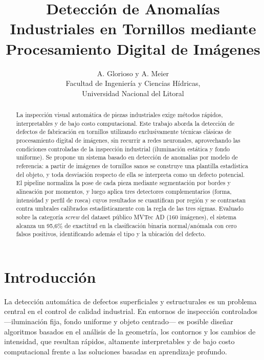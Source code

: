 \documentclass[final]{article}
\begin{document}
\def\tablename{Tabla}          %

\title{Detección de Anomalías Industriales en Tornillos mediante
       Procesamiento Digital de Imágenes}

\author{A. Glorioso y A. Meier \\
        Facultad de Ingeniería y Ciencias Hídricas, \\
        Universidad Nacional del Litoral}

\maketitle

\begin{abstract}
La inspección visual automática de piezas industriales exige métodos rápidos,
interpretables y de bajo costo computacional. Este trabajo aborda la detección
de defectos de fabricación en tornillos utilizando exclusivamente técnicas
clásicas de procesamiento digital de imágenes, sin recurrir a redes neuronales,
aprovechando las condiciones controladas de la inspección industrial
(iluminación estática y fondo uniforme). Se propone un sistema basado en
detección de anomalías por modelo de referencia: a partir de imágenes de
tornillos sanos se construye una plantilla estadística del objeto, y toda
desviación respecto de ella se interpreta como un defecto potencial. El
pipeline normaliza la pose de cada pieza mediante segmentación por bordes y
alineación por momentos, y luego aplica tres detectores complementarios
(forma, intensidad y perfil de rosca) cuyos resultados se cuantifican por
región y se contrastan contra umbrales calibrados estadísticamente con la regla
de las tres sigmas. Evaluado sobre la categoría \emph{screw} del dataset
público MVTec AD (160 imágenes), el sistema alcanza un 95{,}6\% de exactitud
en la clasificación binaria normal/anómala con cero falsos positivos,
identificando además el tipo y la ubicación del defecto.
\end{abstract}

\section{Introducción}

La detección automática de defectos superficiales y estructurales es un
problema central en el control de calidad industrial. En entornos de
inspección controlados —iluminación fija, fondo uniforme y objeto centrado—
es posible diseñar algoritmos basados en el análisis de la geometría, los
contornos y los cambios de intensidad, que resultan rápidos, altamente
interpretables y de bajo costo computacional frente a las soluciones basadas
en aprendizaje profundo.
\end{document}
